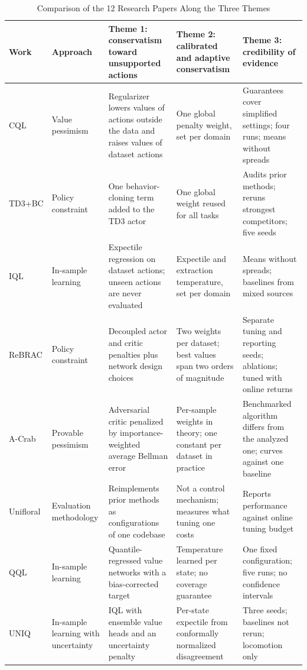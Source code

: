 \documentclass[journal]{IEEEtran}
\begin{document}
\begin{table}[!t]
\caption{Comparison of the 12 Research Papers Along the Three Themes}
\label{tab:comparison}
\centering
\footnotesize
\renewcommand{\arraystretch}{1.15}
\begin{tabularx}{\textwidth}{@{}P{0.105\textwidth}P{0.095\textwidth}LLL@{}}
\toprule
Work & Approach & Theme 1: conservatism toward unsupported actions & Theme 2: calibrated and adaptive conservatism & Theme 3: credibility of evidence \\
\midrule
CQL \cite{kumar2020cql} & Value pessimism & Regularizer lowers values of actions outside the data and raises values of dataset actions & One global penalty weight, set per domain & Guarantees cover simplified settings; four runs; means without spreads \\
TD3+BC \cite{fujimoto2021td3bc} & Policy constraint & One behavior-cloning term added to the TD3 actor & One global weight reused for all tasks & Audits prior methods; reruns strongest competitors; five seeds \\
IQL \cite{kostrikov2022iql} & In-sample learning & Expectile regression on dataset actions; unseen actions are never evaluated & Expectile and extraction temperature, set per domain & Means without spreads; baselines from mixed sources \\
ReBRAC \cite{tarasov2023rebrac} & Policy constraint & Decoupled actor and critic penalties plus network design choices & Two weights per dataset; best values span two orders of magnitude & Separate tuning and reporting seeds; ablations; tuned with online returns \\
A-Crab \cite{zhu2023acrab} & Provable pessimism & Adversarial critic penalized by importance-weighted average Bellman error & Per-sample weights in theory; one constant per dataset in practice & Benchmarked algorithm differs from the analyzed one; curves against one baseline \\
Unifloral \cite{jackson2025unifloral} & Evaluation methodology & Reimplements prior methods as configurations of one codebase & Not a control mechanism; measures what tuning one costs & Reports performance against online tuning budget \\
QQL \cite{gao2026qql} & In-sample learning & Quantile-regressed value networks with a bias-corrected target & Temperature learned per state; no coverage guarantee & One fixed configuration; five runs; no confidence intervals \\
UNIQ \cite{upadhyay2026uniq} & In-sample learning with uncertainty & IQL with ensemble value heads and an uncertainty penalty & Per-state expectile from conformally normalized disagreement & Three seeds; baselines not rerun; locomotion only \\

\end{tabularx}
\end{table}
\end{document}
